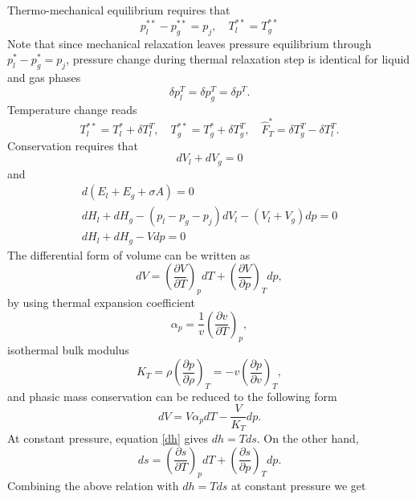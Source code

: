 Thermo-mechanical equilibrium requires that
\begin{equation}
p_l^{**} - p_g^{**} = p_{j}, \quad T_l^{**} = T_g^{**}
\end{equation}
Note that since mechanical relaxation leaves pressure equilibrium through $p_l^* - p_g^* = p_{j}$, pressure change during thermal relaxation step is identical for liquid and gas phases
\begin{equation}
\delta p_l^T = \delta p_g^T  = \delta p^T .
\end{equation}
Temperature change reads
\begin{equation}\label{T_constraint}
T_l^{**} = T_l^* + \delta T_l^T,\quad T_g^{**} = T_g^* + \delta T_g^T,\quad \hat{F}_T^* = \delta T_g^T - \delta T_l^T.
\end{equation}
Conservation requires that
\begin{equation}
dV_l+dV_g=0
\end{equation}
and
\begin{align}
d(E_l+E_g+\sigma A)=0 \\
dH_l+dH_g - (p_l-p_g-p_{j})dV_l - (V_l+V_g)dp = 0 \\
dH_l+dH_g - Vdp = 0
\end{align}
The differential form of volume can be written as
\begin{equation}\label{dV_T}
dV = \left( \frac{\partial V}{\partial T} \right)_p dT + \left( \frac{\partial V}{\partial p} \right)_T dp,
\end{equation}
by using thermal expansion coefficient
\begin{equation}
\alpha_p = \frac1v \left( \frac{\partial v}{\partial T} \right)_p,
\end{equation}
isothermal bulk modulus
\begin{equation}
K_T = \rho \left( \frac{\partial p}{\partial \rho} \right)_T = -v \left( \frac{\partial p}{\partial v} \right)_T,
\end{equation}
and phasic mass conservation can be reduced to the following form
\begin{equation}
dV = V \alpha_p dT - \frac{V}{K_T} dp.
\end{equation}
At constant pressure, equation \eqref{dh} gives $dh = T ds$. On the other hand,
\begin{equation}
ds = \left(\frac{\partial s}{\partial T}\right)_p dT + \left(\frac{\partial s}{\partial p}\right)_T dp.
\end{equation}
Combining the above relation with $dh = T ds$ at constant pressure we get
